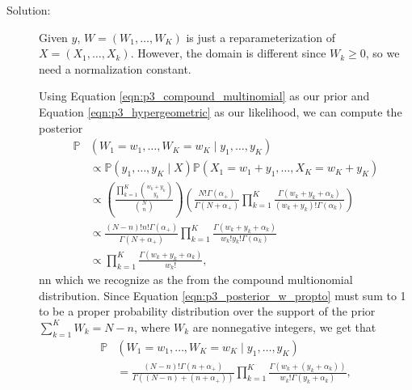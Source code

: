 \documentclass[letterpaper,11pt]{article}
\begin{document}
\begin{enumerate}
\begin{enumerate}
    \begin{description}
    \item[Solution:] Given $y$, $W = \left(W_1,\ldots,W_K\right)$ is just a
      reparameterization of $X = \left(X_1,\ldots,X_k\right)$. However, the
      domain is different since $W_k \geq 0$, so we need a normalization
      constant.

      Using Equation \ref{eqn:p3_compound_multinomial} as our prior and Equation
      \ref{eqn:p3_hypergeometric} as our likelihood, we can compute the posterior
      \begin{align}
        \mathbb{P}
        &\left(
          W_1 = w_1,\ldots,W_K = w_K
          \mid y_1,\ldots,y_K
          \right) \nonumber\\
        &\propto \mathbb{P}\left(
          y_1,\ldots, y_K
          \mid X
          \right)          
        \mathbb{P}\left(
          X_1 = w_1 + y_1,
          \ldots,
          X_K = w_K + y_K
          \right) \nonumber\\
        &\propto
          \left(\frac{\prod_{k=1}^K{w_k + y_k \choose y_k}}{{N \choose n}}\right)
          \left(\frac{N!\Gamma\left(\alpha_+\right)}{\Gamma\left(N + \alpha_+\right)}
          \prod_{k=1}^K\frac{\Gamma\left(w_k + y_k + \alpha_k\right)}{\left(w_k + y_k\right)!\Gamma\left(\alpha_k\right)}\right) \nonumber\\
        &\propto
          \frac{\left(N - n\right)!n!\Gamma\left(\alpha_+\right)}{\Gamma\left(N + \alpha_+\right)}
          \prod_{k=1}^K\frac{\Gamma\left(w_k + y_k + \alpha_k\right)}{w_k!y_k!\Gamma\left(\alpha_k\right)} \nonumber\\
        & \propto \prod_{k=1}^K\frac{\Gamma\left(w_k + y_k + \alpha_k\right)}{w_k!},
          \label{eqn:p3_posterior_w_propto}
      \end{align}nn
      which we recognize as the from the compound multionomial
      distribution. Since Equation \ref{eqn:p3_posterior_w_propto} must sum to 1
      to be a proper probability distribution over the support of the prior
      $\sum_{k=1}^K W_k = N - n$, where $W_k$ are nonnegative integers, we get that      
      \begin{align}
        \mathbb{P}
        &\left(
          W_1 = w_1,\ldots,W_K = w_K
          \mid y_1,\ldots,y_K
          \right) \nonumber\\
        &= \frac{\left(N - n\right)!\Gamma\left(n + \alpha_+\right)}{\Gamma\left(\left(N - n\right) + \left(n + \alpha_+\right)\right)}
          \prod_{k=1}^K\frac{\Gamma\left(w_k + \left(y_k + \alpha_k\right)\right)}{w_k!\Gamma\left(y_k + \alpha_k\right)},

\end{align}
\end{description}
\end{enumerate}
\end{enumerate}
\end{document}
